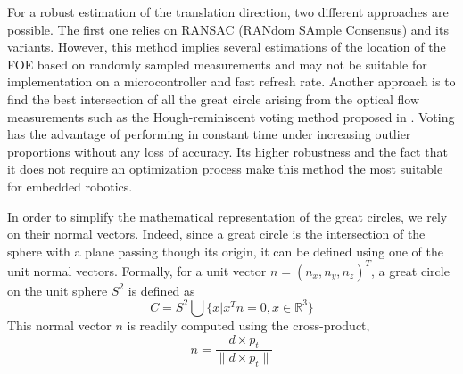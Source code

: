 For a robust estimation of the translation direction, two different approaches are possible. The first one relies on RANSAC (RANdom SAmple Consensus) and its variants. However, this method implies several estimations of the location of the FOE based on randomly sampled measurements and may not be suitable for implementation on a microcontroller and fast refresh rate. Another approach is to find the best intersection of all the great circle arising from the optical flow measurements such as the Hough-reminiscent voting method proposed in \cite{lim}. Voting has the advantage of performing in constant time under increasing outlier proportions without any loss of accuracy. Its higher robustness and the fact that it does not require an optimization process make this method the most suitable for embedded robotics. 
 
In order to simplify the mathematical representation of the great circles, we rely on their normal vectors. Indeed, since a great circle is the intersection of the sphere with a plane passing though its origin, it can be defined using one of the unit normal vectors.
Formally, for a unit vector $n = (n_x, n_y, n_z)^T$, a great circle on the unit sphere $S^2$ is defined as
\begin{equation}
C = S^2\bigcup \{ x|x^Tn = 0, x \in \mathbb{R}^3 \}
\end{equation}
This normal vector $n$ is readily computed using the cross-product,
\begin{equation}
n = \dfrac{d \times p_t}{\|d \times p_t\|}
\end{equation}
